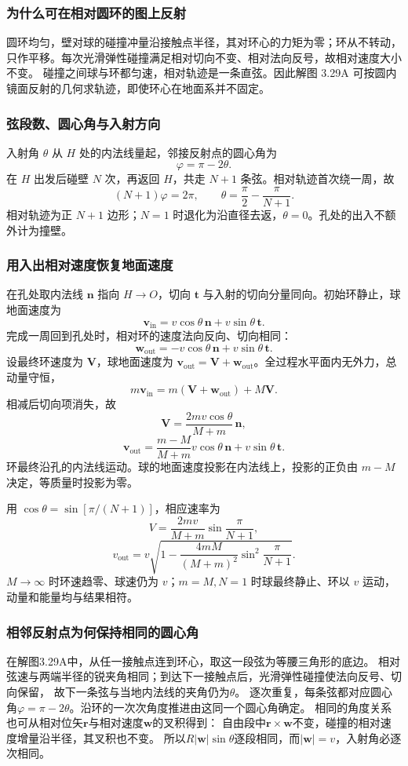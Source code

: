 \documentclass[UTF8,fontset=fandol,a4paper,11pt]{ctexart}
\newcommand{\vect}[1]{\bm{#1}}
\begin{document}
\subsubsection*{为什么可在相对圆环的图上反射}
圆环均匀，壁对球的碰撞冲量沿接触点半径，其对环心的力矩为零；环从不转动，只作平移。每次光滑弹性碰撞满足相对切向不变、相对法向反号，故相对速度大小不变。
碰撞之间球与环都匀速，相对轨迹是一条直弦。因此解图 3.29A 可按圆内镜面反射的几何求轨迹，即使环心在地面系并不固定。

\subsubsection*{弦段数、圆心角与入射方向}
入射角 $\theta$ 从 $H$ 处的内法线量起，邻接反射点的圆心角为
\[
\varphi=\pi-2\theta.
\]
在 $H$ 出发后碰壁 $N$ 次，再返回 $H$，共走 $N+1$ 条弦。相对轨迹首次绕一周，故
\[
(N+1)\varphi=2\pi,\qquad
\boxed{\theta=\frac\pi2-\frac\pi{N+1}}.
\]
相对轨迹为正 $N+1$ 边形；$N=1$ 时退化为沿直径去返，$\theta=0$。孔处的出入不额外计为撞壁。

\subsubsection*{用入出相对速度恢复地面速度}
在孔处取内法线 $\vect n$ 指向 $H\to O$，切向 $\vect t$ 与入射的切向分量同向。初始环静止，球地面速度为
\[
\vect v_{\mathrm{in}}=v\cos\theta\,\vect n+
v\sin\theta\,\vect t.
\]
完成一周回到孔处时，相对环的速度法向反向、切向相同：
\[
\vect w_{\mathrm{out}}=-v\cos\theta\,\vect n+
v\sin\theta\,\vect t.
\]
设最终环速度为 $\vect V$，球地面速度为
$\vect v_{\mathrm{out}}=\vect V+\vect w_{\mathrm{out}}$。全过程水平面内无外力，总动量守恒，
\[
m\vect v_{\mathrm{in}}=m(\vect V+\vect w_{\mathrm{out}})+M\vect V.
\]
相减后切向项消失，故
\[
\boxed{\vect V=\frac{2mv\cos\theta}{M+m}\,\vect n},
\]
\[
\boxed{\vect v_{\mathrm{out}}=
\frac{m-M}{M+m}v\cos\theta\,\vect n
+v\sin\theta\,\vect t}.
\]
环最终沿孔的内法线运动。球的地面速度投影在内法线上，投影的正负由 $m-M$ 决定，等质量时投影为零。

用 $\cos\theta=\sin[\pi/(N+1)]$，相应速率为
\[
\boxed{V=\frac{2mv}{M+m}\sin\frac\pi{N+1}},
\]
\[
\boxed{v_{\mathrm{out}}=
v\sqrt{1-\frac{4mM}{(M+m)^2}\sin^2\frac\pi{N+1}}}.
\]
$M\to\infty$ 时环速趋零、球速仍为 $v$；$m=M,N=1$ 时球最终静止、环以 $v$ 运动，动量和能量均与结果相符。
\subsubsection*{相邻反射点为何保持相同的圆心角}
在解图3.29A中，从任一接触点连到环心，取这一段弦为等腰三角形的底边。
相对弦速与两端半径的锐夹角相同；到达下一接触点后，光滑弹性碰撞使法向反号、切向保留，
故下一条弦与当地内法线的夹角仍为$\theta$。
逐次重复，每条弦都对应圆心角$\varphi=\pi-2\theta$。沿环的一次次角度推进由这同一个圆心角确定。
相同的角度关系也可从相对位矢$\vect r$与相对速度$\vect w$的叉积得到：
自由段中$\vect r\times\vect w$不变，碰撞的相对速度增量沿半径，其叉积也不变。
所以$R|\vect w|\sin\theta$逐段相同，而$|\vect w|=v$，入射角必逐次相同。
\end{document}
